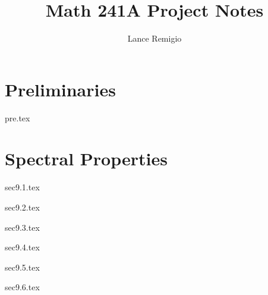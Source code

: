 \documentclass[a4paper]{report}
\title{Math 241A Project Notes}
\author{Lance Remigio}
\begin{document}
\maketitle
\chapter{Preliminaries}

{pre.tex}

\chapter{Spectral Properties}

{sec9.1.tex}

{sec9.2.tex}

{sec9.3.tex}

{sec9.4.tex}

{sec9.5.tex}

{sec9.6.tex}
\end{document}
